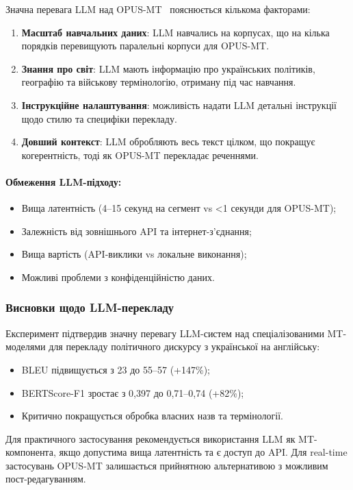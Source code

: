 Значна перевага LLM над OPUS-MT~\cite{opus_mt} пояснюється кількома факторами:

\begin{enumerate}
    \item \textbf{Масштаб навчальних даних}: LLM навчались на корпусах,
    що на кілька порядків перевищують паралельні корпуси для OPUS-MT.

    \item \textbf{Знання про світ}: LLM мають інформацію про
    українських політиків, географію та військову термінологію, отриману
    під час навчання.

    \item \textbf{Інструкційне налаштування}: можливість надати LLM
    детальні інструкції щодо стилю та специфіки перекладу.

    \item \textbf{Довший контекст}: LLM обробляють весь текст цілком,
    що покращує когерентність, тоді як OPUS-MT перекладає
    реченнями.
\end{enumerate}

\paragraph{Обмеження LLM-підходу:}
\begin{itemize}[nosep]
    \item Вища латентність (4--15 секунд на сегмент vs <1 секунди для OPUS-MT);
    \item Залежність від зовнішнього API та інтернет-з'єднання;
    \item Вища вартість (API-виклики vs локальне виконання);
    \item Можливі проблеми з конфіденційністю даних.
\end{itemize}

\subsubsection{Висновки щодо LLM-перекладу}

Експеримент підтвердив значну перевагу LLM-систем над спеціалізованими
MT-моделями для перекладу політичного дискурсу з української на англійську:
\begin{itemize}[nosep]
    \item BLEU підвищується з 23 до 55--57 (+147\%);
    \item BERTScore-F1 зростає з 0,397 до 0,71--0,74 (+82\%);
    \item Критично покращується обробка власних назв та термінології.
\end{itemize}

Для практичного застосування рекомендується використання LLM як
MT-компонента, якщо допустима вища латентність та є доступ до API.
Для real-time застосувань OPUS-MT залишається прийнятною альтернативою
з можливим пост-редагуванням.

\clearpage

